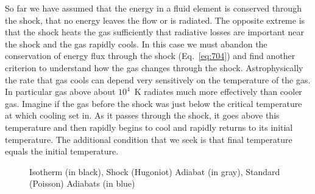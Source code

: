 So far we have assumed that the energy in a fluid element is conserved
through the shock, that no energy leaves the flow or is radiated.  The
opposite extreme is that the shock heats the gas sufficiently that
radiative losses are important near the shock and the gas rapidly
cools.  In this case we must abandon the conservation of energy flux
through the shock (Eq.~\ref{eq:704}) and find another criterion to
understand how the gas changes through the shock.  Astrophysically the
rate that gas cools can depend very sensitively on the temperature of
the gas.  In particular gas above about $10^4$~K radiates much more
effectively than cooler gas.  Imagine if the gas before the shock was
just below the critical temperature at which cooling set in.  As it
passes through the shock, it goes above this temperature and then
rapidly begins to cool and rapidly returns to its initial
temperature.  The additional condition that we seek is that final
temperature equals the initial temperature.
\begin{figure}
\begin{center}
\end{center}
\caption{Isotherm (in black), Shock (Hugoniot) Adiabat (in gray), Standard (Poisson)
  Adiabats (in blue)}
\label{fig:isothermalshock}
\end{figure}

